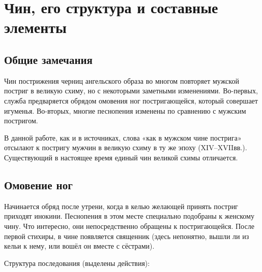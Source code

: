 \chapter{Чин, его структура и составные элементы}\label{ux433ux43bux430ux432ux430-1-ux447ux438ux43d-ux435ux433ux43e-ux441ux442ux440ux443ux43aux442ux443ux440ux430-ux438-ux441ux43eux441ux442ux430ux432ux43dux44bux435-ux44dux43bux435ux43cux435ux43dux442ux44b}

\section*{Общие замечания}\label{ux43eux431ux449ux438ux435-ux437ux430ux43cux435ux447ux430ux43dux438ux44f}

Чин пострижения черниц ангельского образа во многом повторяет мужской постриг в великую схиму, но с некоторыми заметными изменениями.
Во-первых, служба предваряется обрядом омовения ног постригающейся, который совершает игуменья.
Во-вторых, многие песнопения изменены по сравнению с мужским постригом.

В данной работе, как и в источниках, слова «как в мужском чине пострига» отсылают к постригу мужчин в великую схиму в ту же эпоху (XIV--XVIIвв.).
Существующий в настоящее время единый чин великой схимы отличается.

\section*{Омовение ног}\label{ux43eux43cux43eux432ux435ux43dux438ux435-ux43dux43eux433}

Начинается обряд после утрени, когда в келью желающей принять постриг приходят инокини.
Песнопения в этом месте специально подобраны к женскому чину.
Что интересно, они непосредственно обращены к постригающейся.
После первой стихиры, в чине появляется священник (здесь непонятно, вышли ли из кельи к нему, или вошёл он вместе с сёстрами).

Структура последования (выделены действия):


